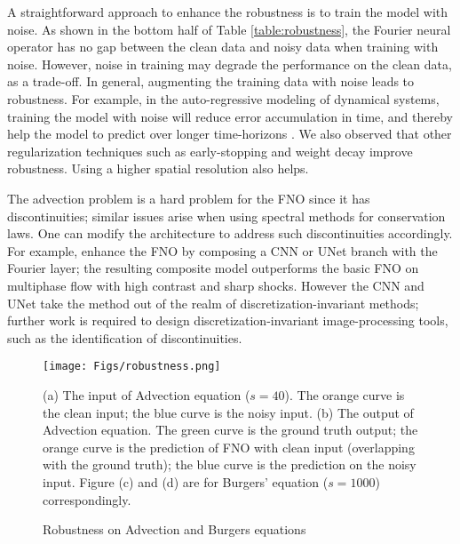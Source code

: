 A straightforward approach to enhance the robustness is to train the model with noise. As shown in the bottom half of Table \ref{table:robustness}, the Fourier neural operator has no gap between the clean data and noisy data when training with noise. However, noise in training may degrade the performance on the clean data, as a trade-off. In general, augmenting the training data with noise leads to robustness. For example, in the auto-regressive modeling of dynamical systems, training the model with noise will reduce error accumulation in time, and thereby help the model to predict over longer time-horizons \citep{pfaff2020learning}.
We also observed that other regularization techniques such as early-stopping and weight decay improve robustness. Using a higher spatial resolution also helps.  

The advection problem is a hard problem for the FNO since it has discontinuities;
similar issues arise when using spectral methods for conservation laws. One can modify the architecture to address such discontinuities accordingly. For example,  \cite{wen2021u} enhance the FNO by composing a CNN or UNet branch with
the Fourier layer; the resulting composite model outperforms the basic FNO on multiphase flow with high contrast and sharp shocks. However the CNN and UNet take the method out of the realm
of discretization-invariant methods; further work is required to design
discretization-invariant image-processing tools, such as the identification of
discontinuities. 

\begin{figure}[ht]
    \centering
    \texttt{[image: Figs/robustness.png]}
        \caption{Robustness on Advection and Burgers equations}\label{fig:robustness}
    \small{
    (a) The input of Advection equation ($s=40$). The orange curve is the clean input; the blue curve is the noisy input. (b) The output of Advection equation.  The green curve is the ground truth output; the orange curve is the prediction of FNO with clean input (overlapping with the ground truth); the blue curve is the prediction on the noisy input. Figure (c) and (d) are for Burgers' equation ($s=1000$) correspondingly.}
\end{figure}
